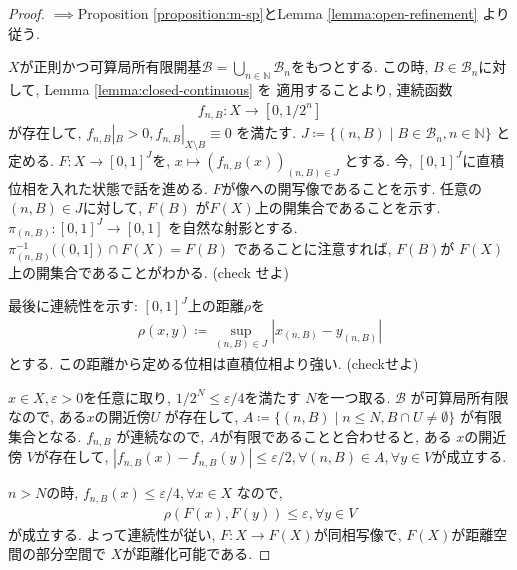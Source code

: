 \documentclass[lualatex]{ltjsbook}
\theoremstyle{remark}
\theoremstyle{plain}
\begin{document}
\begin{proof}
  $\implies$Proposition \ref{proposition:m-sp}とLemma \ref{lemma:open-refinement}
  より従う. 

  $X$が正則かつ可算局所有限開基$\mathcal{B}= \bigcup_{n \in \mathbb{N}} \mathcal{B}_n$をもつとする. 
  この時, $B \in \mathcal{B}_n$に対して, Lemma \ref{lemma:closed-continuous} を
  適用することより, 連続函数
  \begin{equation}
    \begin{aligned}
      f_{n,B}: X \to  [0, 1/2^n]
    \end{aligned}
  \end{equation} 
  が存在して, $f_{n,B}|_B >0, f_{n,B}|_{X \setminus B} \equiv 0$ を満たす. $J\coloneqq \{(n,B)  \mid B \in \mathcal{B}_n, n \in \mathbb{N}\} $
  と定める. $F:X \to [0,1]^J$を, $x \mapsto (f_{n,B}(x))_{(n,B) \in J}$ とする. 
  今, $[0,1]^J$に直積位相を入れた状態で話を進める.  $F$が像への開写像であることを示す. 
  任意の $(n,B) \in J$に対して, $F(B)$ が$F(X)$上の開集合であることを示す. 
  $\pi_{(n,B)} : [0,1]^J \to [0,1]$ を自然な射影とする. $\pi_{(n,B)}^{-1}((0,1]) \cap F(X) = F(B)$ 
  であることに注意すれば, $F(B)$が $F(X)$上の開集合であることがわかる. (check せよ)

  最後に連続性を示す:  $[0,1]^J$上の距離$\rho$を 
  \begin{equation}
    \begin{aligned}
      \rho (x,y) \coloneqq \sup_{(n,B) \in J}| x_{(n,B)} - y _{(n,B)}|
    \end{aligned}
  \end{equation} 
  とする. この距離から定める位相は直積位相より強い. (checkせよ)

  $x \in X, \varepsilon >0$を任意に取り, $1/2^N \leq \varepsilon /4 $を満たす $N$を一つ取る. 
  $\mathcal{B}$ が可算局所有限なので, ある$x$の開近傍$U$ が存在して, $A\coloneqq \{(n,B)  \mid n \leq N, B \cap U \neq \emptyset \} $ 
  が有限集合となる. 
  $f_{n,B}$ が連続なので, $A$が有限であることと合わせると, ある $x$の開近傍 $V$が存在して, 
   $|f_{n,B}(x) - f_{n,B}(y)| \leq \varepsilon /2, \forall (n,B) \in A, \forall y \in V$が成立する. 

   $n >N$の時,  $f_{n,B}(x) \leq \varepsilon /4 , \forall x \in X$ なので, 
   \begin{equation}
     \begin{aligned}
       \rho (F(x) ,F(y)) \leq \varepsilon , \forall y \in V
     \end{aligned}
   \end{equation} 
   が成立する. よって連続性が従い, $F: X \to F(X)$が同相写像で, $F(X)$が距離空間の部分空間で $X$が距離化可能である. 



\end{proof}
 
\end{document}
